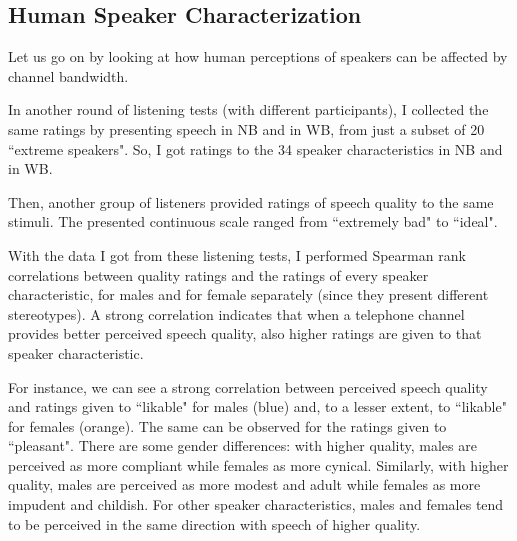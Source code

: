 \documentclass[a4paper]{article}
\begin{document}
\subsection{Human Speaker Characterization}

Let us go on by looking at how human perceptions of speakers can be affected by channel bandwidth.

In another round of listening tests (with different participants), I collected the same ratings by presenting speech in NB and in WB, from just a subset of 20 ``extreme speakers". So, I got ratings to the 34 speaker characteristics in NB and in WB.

Then, another group of listeners provided ratings of speech quality to the same stimuli. The presented continuous scale ranged from ``extremely bad" to ``ideal".


With the data I got from these listening tests, I performed Spearman rank correlations between quality ratings and the ratings of every speaker characteristic, for males and for female separately (since they present different stereotypes). A strong correlation indicates that when a telephone channel provides better perceived speech quality, also higher ratings are given to that speaker characteristic. 

For instance, we can see a strong correlation between perceived speech quality and ratings given to ``likable" for males (blue) and, to a lesser extent, to ``likable" for females (orange). The same can be observed for the ratings given to ``pleasant". There are some gender differences: with higher quality, males are perceived as more compliant while females as more cynical. Similarly, with higher quality, males are perceived as more modest and adult while females as more impudent and childish. For other speaker characteristics, males and females tend to be perceived in the same direction with speech of higher quality. 
\end{document}
